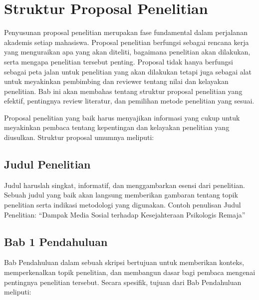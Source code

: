 \documentclass[
  indonesian,
  letterpaper,
]{scrbook}
\begin{document}

\chapter{Struktur Proposal
Penelitian}\label{struktur-proposal-penelitian}

Penyusunan proposal penelitian merupakan fase fundamental dalam
perjalanan akademis setiap mahasiswa. Proposal penelitian berfungsi
sebagai rencana kerja yang menguraikan apa yang akan diteliti, bagaimana
penelitian akan dilakukan, serta mengapa penelitian tersebut penting.
Proposal tidak hanya berfungsi sebagai peta jalan untuk penelitian yang
akan dilakukan tetapi juga sebagai alat untuk meyakinkan pembimbing dan
reviewer tentang nilai dan kelayakan penelitian. Bab ini akan membahas
tentang struktur proposal penelitian yang efektif, pentingnya review
literatur, dan pemilihan metode penelitian yang sesuai.

Proposal penelitian yang baik harus menyajikan informasi yang cukup
untuk meyakinkan pembaca tentang kepentingan dan kelayakan penelitian
yang diusulkan. Struktur proposal umumnya meliputi:

\section{Judul Penelitian}\label{judul-penelitian}

Judul haruslah singkat, informatif, dan menggambarkan esensi dari
penelitian. Sebuah judul yang baik akan langsung memberikan gambaran
tentang topik penelitian serta indikasi metodologi yang digunakan.
Contoh penulisan Judul Penelitian: ``Dampak Media Sosial terhadap
Kesejahteraan Psikologis Remaja''

\section{Bab 1 Pendahuluan}\label{bab-1-pendahuluan}

Bab Pendahuluan dalam sebuah skripsi bertujuan untuk memberikan konteks,
memperkenalkan topik penelitian, dan membangun dasar bagi pembaca
mengenai pentingnya penelitian tersebut. Secara spesifik, tujuan dari
Bab Pendahuluan meliputi:
\end{document}
